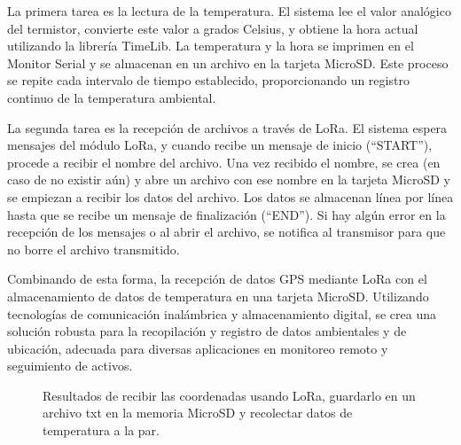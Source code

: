 \begin{itemize}
La primera tarea es la lectura de la temperatura. El sistema lee el valor analógico del termistor, convierte este valor a grados Celsius, y obtiene la hora actual utilizando la librería TimeLib. La temperatura y la hora se imprimen en el Monitor Serial y se almacenan en un archivo en la tarjeta MicroSD. Este proceso se repite cada intervalo de tiempo establecido, proporcionando un registro continuo de la temperatura ambiental.

La segunda tarea es la recepción de archivos a través de LoRa. El sistema espera mensajes del módulo LoRa, y cuando recibe un mensaje de inicio (``START''), procede a recibir el nombre del archivo. Una vez recibido el nombre, se crea (en caso de no existir aún) y abre un archivo con ese nombre en la tarjeta MicroSD y se empiezan a recibir los datos del archivo. Los datos se almacenan línea por línea hasta que se recibe un mensaje de finalización (``END''). Si hay algún error en la recepción de los mensajes o al abrir el archivo, se notifica al transmisor para que no borre el archivo transmitido.

Combinando de esta forma, la recepción de datos GPS mediante LoRa con el almacenamiento de datos de temperatura en una tarjeta MicroSD. Utilizando tecnologías de comunicación inalámbrica y almacenamiento digital, se crea una solución robusta para la recopilación y registro de datos ambientales y de ubicación, adecuada para diversas aplicaciones en monitoreo remoto y seguimiento de activos.

\begin{figure}[H]
    \begin{minipage}{\textwidth}
        \centering
        \begin{minipage}{\textwidth}
            \centering
        \end{minipage}
    \end{minipage}
    \caption{Resultados de recibir las coordenadas usando LoRa, guardarlo en un archivo txt en la memoria MicroSD y recolectar datos de temperatura a la par.}
\end{figure}


\end{itemize}
